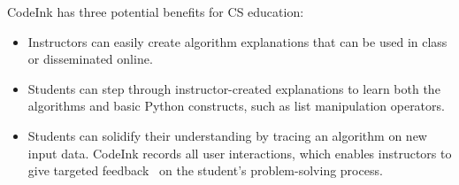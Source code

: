 CodeInk has three potential benefits for CS education:

\begin{itemize}\itemsep2pt

\item Instructors can easily create algorithm explanations that can be
used in class or disseminated online.

\item Students can step through instructor-created explanations to learn
both the algorithms and basic Python constructs, such as list
manipulation operators.

\item Students can solidify their understanding by tracing an algorithm on new
input data. CodeInk records all user interactions, which enables instructors to
give targeted feedback~\cite{Balzer1989} on the student's problem-solving
process.

\end{itemize}